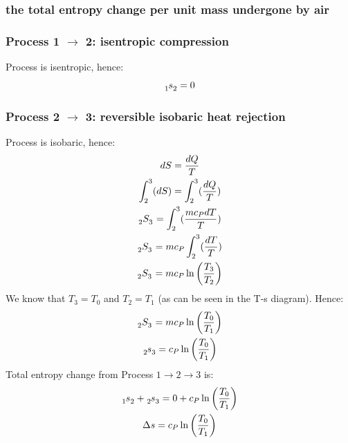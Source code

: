 \documentclass[12pt]{article}
\numberwithin{equation}{section}
\begin{document}
\begin{flushleft}
\subsubsection{the total entropy change per unit mass undergone by air}
\subsubsection*{Process 1 $\rightarrow$ 2: isentropic compression}
Process is isentropic, hence:
\begin{equation}
  \tensor[_1]{s}{_2} = 0
\end{equation}
\subsubsection*{Process 2 $\rightarrow$ 3: reversible isobaric heat rejection}
Process is isobaric, hence:
\begin{gather}
  dS = \frac{dQ}{T}\\
  \int_2^3 (dS) = \int_2^3 (\frac{dQ}{T})\\
  \tensor[_2]{S}{_3} = \int_2^3 (\frac{mc_PdT}{T})\\
  \tensor[_2]{S}{_3} = mc_P\int_2^3 (\frac{dT}{T})\\
  \tensor[_2]{S}{_3} = mc_P \ln \left( \frac{T_3}{T_2} \right)
\end{gather}
We know that $T_3 = T_0$ and $T_2 = T_1$ (as can be seen in the T-s diagram). Hence:
\begin{gather}
  \tensor[_2]{S}{_3} = mc_P \ln \left( \frac{T_0}{T_1} \right)\\
  \tensor[_2]{s}{_3} = c_P \ln \left( \frac{T_0}{T_1} \right)
\end{gather}
Total entropy change from Process $1 \rightarrow 2 \rightarrow 3$ is:
\begin{gather}
  \tensor[_1]{s}{_2} + \tensor[_2]{s}{_3} = 0 + c_P \ln \left( \frac{T_0}{T_1} \right)\\
  \Delta s = c_P \ln \left( \frac{T_0}{T_1} \right)
\end{gather}


\end{flushleft}
\end{document}
